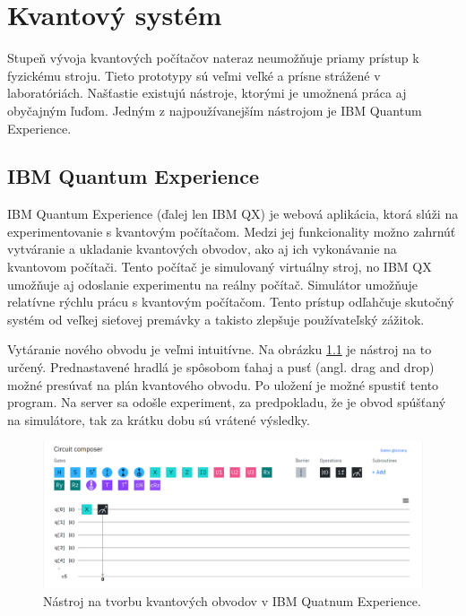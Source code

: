 
\chapter{Kvantový systém}

Stupeň vývoja kvantových počítačov nateraz neumožňuje priamy prístup k
fyzickému stroju. Tieto prototypy sú veľmi veľké a prísne strážené v 
laboratóriách. Našťastie existujú nástroje, ktorými je umožnená práca aj 
obyčajným ľuďom. Jedným z najpoužívanejším nástrojom je IBM Quantum Experience. 

\section{IBM Quantum Experience}
IBM Quantum Experience (ďalej len IBM QX) je webová aplikácia, ktorá 
slúži na experimentovanie s kvantovým počítačom. Medzi jej funkcionality 
možno zahrnúť vytváranie a ukladanie kvantových obvodov, ako aj ich 
vykonávanie na kvantovom počítači. Tento počítač je simulovaný virtuálny 
stroj, no IBM QX umožňuje aj odoslanie experimentu na reálny počítač. 
Simulátor umožňuje relatívne rýchlu prácu s kvantovým počítačom. Tento
prístup odľahčuje skutočný systém od veľkej sieťovej premávky a takisto 
zlepšuje používateľský zážitok.

Vytáranie nového obvodu je veľmi intuitívne. Na obrázku \ref{ibm_qx_composer}
je nástroj na to určený. Prednastavené hradlá je spôsobom ťahaj a pusť (angl.
drag and drop) možné presúvať na plán kvantového obvodu. Po uložení je možné
spustiť tento program. Na server sa odošle experiment, za predpokladu, že
je obvod spúšťaný na simulátore, tak za krátku dobu sú vrátené výsledky.

\begin{figure} 
	\centering 
	\includegraphics[width=1\textwidth]{figures/ibm_qx_composer.png} 
	\caption{Nástroj na tvorbu kvantových obvodov v IBM Quatnum Experience.}
    \label{ibm_qx_composer}
\end{figure}


